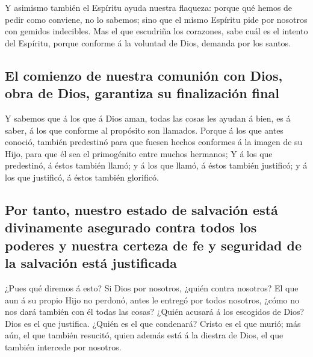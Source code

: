  Y asimismo también el Espíritu ayuda nuestra flaqueza:
porque qué hemos de pedir como conviene, no lo sabemos; sino que el
mismo Espíritu pide por nosotros con gemidos indecibles. 
Mas el que escudriña los corazones, sabe cuál es el intento del
Espíritu, porque conforme á la voluntad de Dios, demanda por los santos.

\hypertarget{el-comienzo-de-nuestra-comuniuxf3n-con-dios-obra-de-dios-garantiza-su-finalizaciuxf3n-final}{%
\subsection{El comienzo de nuestra comunión con Dios, obra de Dios,
garantiza su finalización
final}\label{el-comienzo-de-nuestra-comuniuxf3n-con-dios-obra-de-dios-garantiza-su-finalizaciuxf3n-final}}

 Y sabemos que á los que á Dios aman, todas las cosas les
ayudan á bien, es á saber, á los que conforme al propósito son llamados.
 Porque á los que antes conoció, también predestinó para
que fuesen hechos conformes á la imagen de su Hijo, para que él sea el
primogénito entre muchos hermanos;  Y á los que
predestinó, á éstos también llamó; y á los que llamó, á éstos también
justificó; y á los que justificó, á éstos también glorificó.

\hypertarget{por-tanto-nuestro-estado-de-salvaciuxf3n-estuxe1-divinamente-asegurado-contra-todos-los-poderes-y-nuestra-certeza-de-fe-y-seguridad-de-la-salvaciuxf3n-estuxe1-justificada}{%
\subsection{Por tanto, nuestro estado de salvación está divinamente
asegurado contra todos los poderes y nuestra certeza de fe y seguridad
de la salvación está
justificada}\label{por-tanto-nuestro-estado-de-salvaciuxf3n-estuxe1-divinamente-asegurado-contra-todos-los-poderes-y-nuestra-certeza-de-fe-y-seguridad-de-la-salvaciuxf3n-estuxe1-justificada}}

 ¿Pues qué diremos á esto? Si Dios por nosotros, ¿quién
contra nosotros?  El que aun á su propio Hijo no perdonó,
antes le entregó por todos nosotros, ¿cómo no nos dará también con él
todas las cosas?  ¿Quién acusará á los escogidos de Dios?
Dios es el que justifica.  ¿Quién es el que condenará?
Cristo es el que murió; más aún, el que también resucitó, quien además
está á la diestra de Dios, el que también intercede por nosotros.

